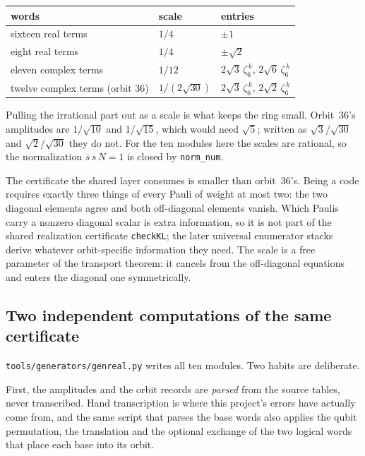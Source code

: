 \documentclass[11pt,a4paper]{article}
\newcommand{\lean}[1]{\texttt{#1}}
\theoremstyle{definition}
\begin{document}
\begin{center}
\begin{tabular}{lll}
\toprule
words & scale & entries \\
\midrule
sixteen real terms & $1/4$ & $\pm1$ \\
eight real terms & $1/4$ & $\pm\sqrt2$ \\
eleven complex terms & $1/12$ &
  $2\sqrt3\,\zeta_6^{\,k}$, $2\sqrt6\,\zeta_6^{\,k}$ \\
twelve complex terms (orbit 36) & $1/(2\sqrt{30})$ &
  $2\sqrt3\,\zeta_6^{\,k}$, $2\sqrt2\,\zeta_6^{\,k}$ \\
\bottomrule
\end{tabular}
\end{center}

Pulling the irrational part out as a scale is what keeps the ring small.
Orbit~36's amplitudes are $1/\sqrt{10}$ and $1/\sqrt{15}$, which would need
$\sqrt5$; written as $\sqrt3/\sqrt{30}$ and $\sqrt2/\sqrt{30}$ they do not.
For the ten modules here the scales are rational, so the normalization
$\overline{s}\,s\,N=1$ is closed by \lean{norm\_num}.

The certificate the shared layer consumes is smaller than orbit~36's. Being a
code requires exactly three things of every Pauli of weight at most two: the
two diagonal elements agree and both off-diagonal elements vanish. Which
Paulis carry a nonzero diagonal scalar is extra information, so it is not part
of the shared realization certificate \lean{checkKL}; the later universal
enumerator stacks derive whatever orbit-specific information they need. The
scale is a free parameter of the transport theorem: it
cancels from the off-diagonal equations and enters the diagonal one
symmetrically.

\subsection{Two independent computations of the same certificate}

\lean{tools/generators/genreal.py} writes all ten modules. Two habits are
deliberate.

First, the amplitudes and the orbit records are \emph{parsed} from the source
tables, never transcribed. Hand transcription is where this project's errors
have actually come from, and the same script that parses the base words also
applies the qubit permutation, the translation and the optional exchange of the
two logical words that place each base into its orbit.
\end{document}

